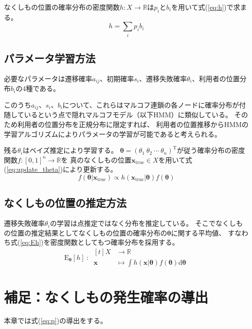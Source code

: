 \documentclass{jarticle}
\numberwithin{equation}{section}
\numberwithin{table}{section}
\theoremstyle{plain}
\begin{document}
なくしもの位置の確率分布の密度関数$h:X \rightarrow \mathbb{R}$は$p_i$と$b_i$を用いて式(\ref{eq:h})で求まる。
\begin{equation}
    \label{eq:h}
    h = \sum_{i} {p_i b_i}
\end{equation}


\subsection{パラメータ学習方法}
必要なパラメータは遷移確率$a_{i j}$、初期確率$s_i$、遷移失敗確率$\theta_i$、利用者の位置分布$b_i$の4種である。

このうち$a_{i j}$、$s_i$、$b_i$について、これらはマルコフ連鎖の各ノードに確率分布が付随しているという点で隠れマルコフモデル（以下HMM）に類似している。
そのため利用者の位置分布を正規分布に限定すれば、
利用者の位置推移からHMMの学習アルゴリズムによりパラメータの学習が可能であると考えられる。

残る$\theta_i$はベイズ推定により学習する。
$\bm{\theta} = (\theta_1\ \theta_2\ \cdots\ \theta_n)^\mathrm{T}$が従う確率分布の密度関数$f:[0,1]^n \rightarrow \mathbb{R}$を
真のなくしもの位置$\bm{x}_\mathrm{true} \in X$を用いて式(\ref{eq:update_theta})により更新する。
\begin{equation}
    \label{eq:update_theta}
    f(\bm{\theta} | \bm{x}_\mathrm{true}) \propto h(\bm{x}_\mathrm{true} | \bm{\theta}) f(\bm{\theta})
\end{equation}


\subsection{なくしもの位置の推定方法}
遷移失敗確率$\theta_i$の学習は点推定ではなく分布を推定している。
そこでなくしもの位置の推定結果としてなくしもの位置の確率分布の$\bm{\theta}$に関する平均値、
すなわち式(\ref{eq:Eh})を密度関数としてもつ確率分布を採用する。
\begin{equation}
    \label{eq:Eh}
    \mathrm{E}_\bm{\theta} [h]\ :\ 
    \begin{aligned}[t]
        X &\rightarrow \mathbb{R} \\
        \bm{x} &\mapsto \int {h(\bm{x} | \bm{\theta}) f(\bm{\theta}) \mathrm{d} \bm{\theta}}
    \end{aligned}
\end{equation}


\section{補足：なくしもの発生確率の導出}
\label{sec:calc_p}
本章では式(\ref{eq:p})の導出をする。
\end{document}
